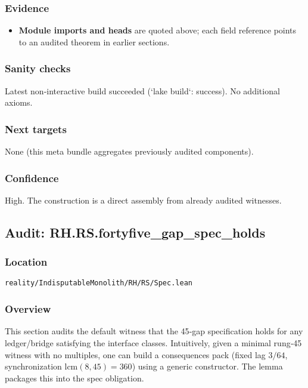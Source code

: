 \documentclass{article}
\newcommand{\FileRef}[1]{\texttt{#1}}
\begin{document}
\subsubsection{Evidence}
\begin{itemize}[leftmargin=*]
  \item \textbf{Module imports and heads} are quoted above; each field reference points to an audited theorem in earlier sections.
\end{itemize}

\subsubsection{Sanity checks}
Latest non‑interactive build succeeded (`lake build`: success). No additional axioms.

\subsubsection{Next targets}
None (this meta bundle aggregates previously audited components).

\subsubsection{Confidence}
High. The construction is a direct assembly from already audited witnesses.

\subsection{Audit: RH.RS.fortyfive\_gap\_spec\_holds}
\subsubsection{Location}
\FileRef{reality/IndisputableMonolith/RH/RS/Spec.lean}

\subsubsection{Overview}
This section audits the default witness that the 45‑gap specification holds for any ledger/bridge satisfying the interface classes. Intuitively, given a minimal rung‑45 witness with no multiples, one can build a consequences pack (fixed lag \(3/64\), synchronization \(\mathrm{lcm}(8,45)=360\)) using a generic constructor. The lemma packages this into the spec obligation.
\end{document}
